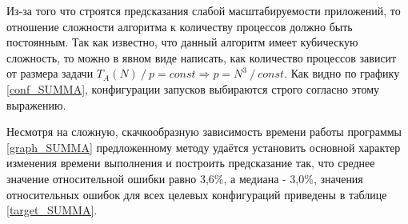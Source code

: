 
			Из-за того что строятся предсказания слабой масштабируемости приложений, то отношение сложности алгоритма к количеству процессов должно быть постоянным. Так как известно, что данный алгоритм имеет кубическую сложность, то можно в явном виде написать, как количество процессов зависит от размера задачи \(T_A(N)\:/\:p = const \Rightarrow p = N^3\:/\:const\). Как видно по графику \eqref{conf_SUMMA}, конфигурации запусков выбираются строго согласно этому выражению.

			Несмотря на сложную, скачкообразную зависимость времени работы программы \eqref{graph_SUMMA} предложенному методу удаётся установить основной характер изменения времени выполнения и построить предсказание так, что среднее значение относительной ошибки равно 3,6\%, а медиана - 3,0\%, значения относительных ошибок для всех целевых конфигураций приведены в таблице \eqref{target_SUMMA}.

